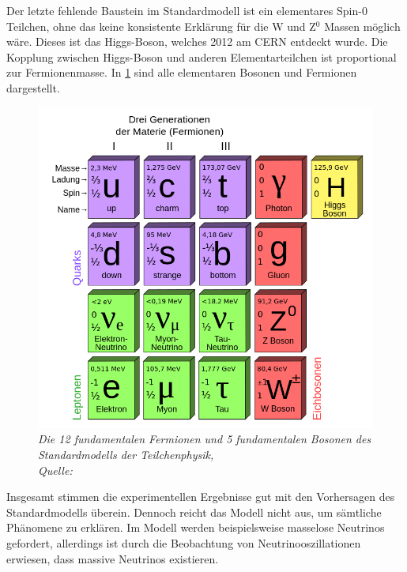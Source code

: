 Der letzte fehlende Baustein im Standardmodell ist ein elementares Spin-0 Teilchen, ohne das keine konsistente Erkl\"arung f\"ur die W und Z$^0$ Massen m\"oglich w\"are. Dieses ist das Higgs-Boson, welches 2012 am CERN entdeckt wurde. Die Kopplung zwischen Higgs-Boson und anderen Elementarteilchen ist proportional zur Fermionenmasse. In \ref{fig:Standardmodell} sind alle elementaren Bosonen und Fermionen dargestellt.

\begin{figure}[hhh]
 \begin{center}
   \includegraphics[width=\textwidth]{graphics/Standard_Model.png}
   \parbox[b]{12cm}{
     \caption[Standardmodell der Teilchenphysik]
             {\label{fig:Standardmodell} \it Die 12 fundamentalen Fermionen und 5 fundamentalen Bosonen des Standardmodells der Teilchenphysik,\\ Quelle: \cite{wiki:Standardmodell}}
   }
 \end{center}
\end{figure}

Insgesamt stimmen die experimentellen Ergebnisse gut mit den Vorhersagen des Standardmodells \"uberein. Dennoch reicht das Modell nicht aus, um s\"amtliche Ph\"anomene zu erkl\"aren. Im Modell werden beispielsweise masselose Neutrinos gefordert, allerdings ist durch die Beobachtung von Neutrinooszillationen erwiesen, dass massive Neutrinos existieren.

